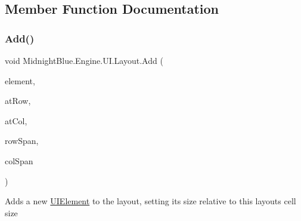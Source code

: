 \subsection{Member Function Documentation}
\hypertarget{class_midnight_blue_1_1_engine_1_1_u_i_1_1_layout_afa3293d67ab980b6b19501fa965ae38f}{}\label{class_midnight_blue_1_1_engine_1_1_u_i_1_1_layout_afa3293d67ab980b6b19501fa965ae38f} 
\subsubsection{\texorpdfstring{Add()}{Add()}}
{\footnotesize\ttfamily void Midnight\+Blue.\+Engine.\+U\+I.\+Layout.\+Add (\begin{DoxyParamCaption}\item[{\hyperlink{class_midnight_blue_1_1_engine_1_1_u_i_1_1_u_i_element}{U\+I\+Element}}]{element,  }\item[{int}]{at\+Row,  }\item[{int}]{at\+Col,  }\item[{int}]{row\+Span,  }\item[{int}]{col\+Span }\end{DoxyParamCaption})\hspace{0.3cm}{\ttfamily [inline]}}



Adds a new \hyperlink{class_midnight_blue_1_1_engine_1_1_u_i_1_1_u_i_element}{U\+I\+Element} to the layout, setting its size relative to this layouts cell size 


